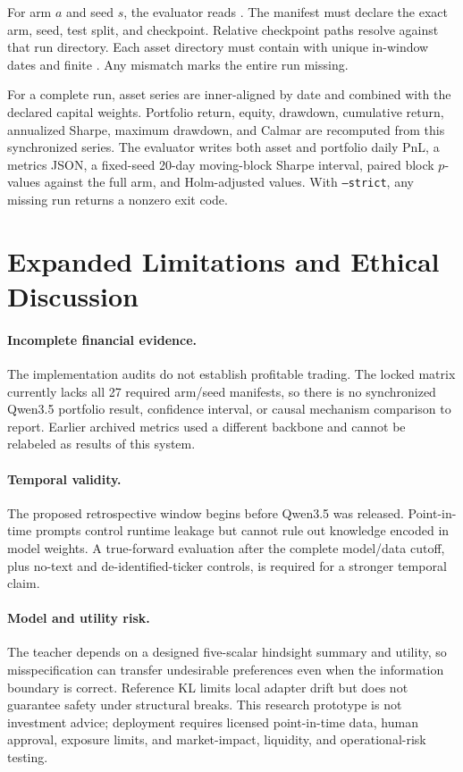 For arm $a$ and seed $s$, the evaluator reads . The manifest must declare the exact arm, seed, test split, and checkpoint. Relative checkpoint paths resolve against that run directory. Each asset directory must contain  with unique in-window dates and finite . Any mismatch marks the entire run missing.

For a complete run, asset series are inner-aligned by date and combined with the declared capital weights. Portfolio return, equity, drawdown, cumulative return, annualized Sharpe, maximum drawdown, and Calmar are recomputed from this synchronized series. The evaluator writes both asset and portfolio daily PnL, a metrics JSON, a fixed-seed 20-day moving-block Sharpe interval, paired block $p$-values against the full arm, and Holm-adjusted values. With \texttt{--strict}, any missing run returns a nonzero exit code.

\section{Expanded Limitations and Ethical Discussion}
\label{sec:limitations}

\paragraph{Incomplete financial evidence.}
The implementation audits do not establish profitable trading. The locked matrix currently lacks all 27 required arm/seed manifests, so there is no synchronized Qwen3.5 portfolio result, confidence interval, or causal mechanism comparison to report. Earlier archived metrics used a different backbone and cannot be relabeled as results of this system.

\paragraph{Temporal validity.}
The proposed retrospective window begins before Qwen3.5 was released. Point-in-time prompts control runtime leakage but cannot rule out knowledge encoded in model weights. A true-forward evaluation after the complete model/data cutoff, plus no-text and de-identified-ticker controls, is required for a stronger temporal claim.

\paragraph{Model and utility risk.}
The teacher depends on a designed five-scalar hindsight summary and utility, so misspecification can transfer undesirable preferences even when the information boundary is correct. Reference KL limits local adapter drift but does not guarantee safety under structural breaks. This research prototype is not investment advice; deployment requires licensed point-in-time data, human approval, exposure limits, and market-impact, liquidity, and operational-risk testing.
